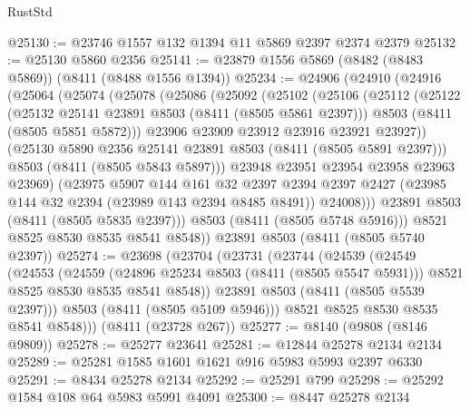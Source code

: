 \begin{lexlean}{RustStd}
\begin{coremodule}
@25130 := @23746 @1557 @132 @1394 @11 @5869 @2397 @2374 @2379
@25132 := @25130 @5860 @2356
@25141 := @23879 @1556 @5869 (@8482 (@8483 @5869)) (@8411 (@8488 @1556 @1394))
@25234 := @24906
    (@24910
      (@24916
        (@25064
          (@25074
            (@25078
              (@25086
                (@25092
                  (@25102
                    (@25106
                      (@25112
                        (@25122
                          (@25132 @25141 @23891 @8503 (@8411 (@8505 @5861 @2397)))
                          @8503
                          (@8411 (@8505 @5851 @5872)))
                        @23906
                        @23909
                        @23912
                        @23916
                        @23921
                        @23927))
                    (@25130 @5890 @2356 @25141 @23891 @8503 (@8411 (@8505 @5891 @2397)))
                    @8503
                    (@8411 (@8505 @5843 @5897)))
                  @23948
                  @23951
                  @23954
                  @23958
                  @23963
                  @23969)
                (@23975
                  @5907
                  @144
                  @161
                  @32
                  @2397
                  @2394
                  @2397
                  @2427
                  (@23985 @144 @32 @2394 (@23989 @143 @2394 @8485 @8491))
                  @24008)))
            @23891
            @8503
            (@8411 (@8505 @5835 @2397)))
          @8503
          (@8411 (@8505 @5748 @5916)))
        @8521
        @8525
        @8530
        @8535
        @8541
        @8548))
    @23891
    @8503
    (@8411 (@8505 @5740 @2397))
@25274 := @23698
    (@23704
      (@23731
        (@23744
          (@24539
            (@24549
              (@24553
                (@24559
                  (@24896 @25234 @8503 (@8411 (@8505 @5547 @5931)))
                  @8521
                  @8525
                  @8530
                  @8535
                  @8541
                  @8548))
              @23891
              @8503
              (@8411 (@8505 @5539 @2397)))
            @8503
            (@8411 (@8505 @5109 @5946)))
          @8521
          @8525
          @8530
          @8535
          @8541
          @8548)))
    (@8411 (@23728 @267))
@25277 := @8140 (@9808 (@8146 @9809))
@25278 := @25277 @23641
@25281 := @12844 @25278 @2134 @2134
@25289 := @25281 @1585 @1601 @1621 @916 @5983 @5993 @2397 @6330
@25291 := @8434 @25278 @2134
@25292 := @25291 @799
@25298 := @25292 @1584 @108 @64 @5983 @5991 @4091
@25300 := @8447 @25278 @2134

\end{coremodule}
\end{lexlean}
